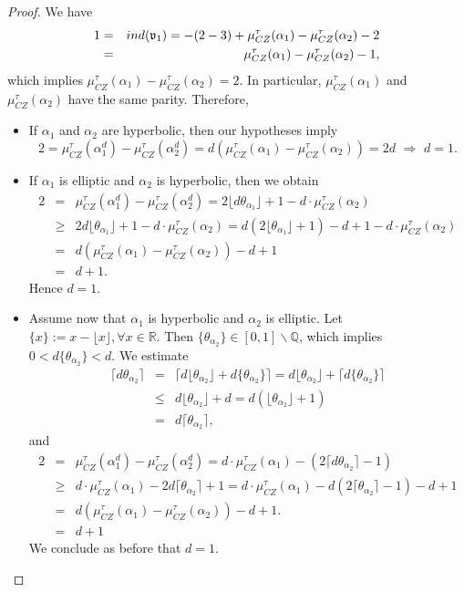 \documentclass[10pt,a4paper]{amsart}
\newcommand{\CZ}{\mu_{CZ}^{\tau}}
\newcommand{\Q}{\mathbb{Q}}
\newcommand{\R}{\mathbb{R}}
\newcommand{\ind}{\textnormal{ind}}
\begin{document}
\begin{proof}
We have
\begin{eqnarray*}
1&=&\ind(\mathfrak{v}_1)=-(2-3)+\CZ(\alpha_1)-\CZ(\alpha_2)-2\\
&=& \CZ(\alpha_1)-\CZ(\alpha_2)-1,
\end{eqnarray*}
which implies
$\CZ(\alpha_1)-\CZ(\alpha_2)=2.$
In particular, $\CZ(\alpha_1)$ and $\CZ(\alpha_2)$ have the same parity. Therefore,
\begin{itemize}
    \item If $\alpha_1$ and $\alpha_2$ are hyperbolic, then our hypotheses imply
     $$2=\CZ(\alpha_1^d)-\CZ(\alpha_2^d)=d(\CZ(\alpha_1)-\CZ(\alpha_2))=2d \,\,\Rightarrow \,\, d =1.$$
     \item If $\alpha_1$ is elliptic and $\alpha_2$ is hyperbolic, then we obtain
     \begin{eqnarray*}
     2&=& \CZ(\alpha_1^d)-\CZ(\alpha_2^d)=2\lfloor d\theta_{\alpha_1}\rfloor+1 -d\cdot\CZ(\alpha_2)\\
     &\geq & 2d\lfloor \theta_{\alpha_1}\rfloor+1 -d \cdot \CZ(\alpha_2)=d(2\lfloor \theta_{\alpha_1}\rfloor+1)-d+1 -d \cdot\CZ(\alpha_2)\\
     &=&d(\CZ(\alpha_1)-\CZ(\alpha_2))-d+1\\
     &=& d+1.
     \end{eqnarray*}
     Hence  $d=1$.
     \item Assume now that $\alpha_1$ is hyperbolic and $\alpha_2$ is elliptic. Let $\{x\}:=x-\lfloor x \rfloor, \forall x\in \R$. Then $\{\theta_{\alpha_2}\} \in [0,1] \backslash \Q$, which implies $0<d\{\theta_{\alpha_2}\}<d$. We estimate
    \begin{eqnarray*}
    \lceil d\theta_{\alpha_2} \rceil &=& \big\lceil d \lfloor \theta_{\alpha_2} \rfloor + d\{\theta_{\alpha_2}\} \big\rceil = d \lfloor \theta_{\alpha_2} \rfloor + \lceil d\{\theta_{\alpha_2}\} \rceil \\
    &\leq & d \lfloor \theta_{\alpha_2} \rfloor +d = d(\lfloor \theta_{\alpha_2} \rfloor + 1) \\
    &=& d\lceil \theta_{\alpha_2}\rceil,
    \end{eqnarray*}
    and
    \begin{eqnarray*}
    2&=& \CZ(\alpha_1^d)-\CZ(\alpha_2^d)= d \cdot \CZ(\alpha_1)-(2\lceil d\theta_{\alpha_2}\rceil-1)\\
    &\geq& d \cdot \CZ(\alpha_1)-2d \lceil \theta_{\alpha_2} \rceil + 1 = d \cdot \CZ(\alpha_1)-d(2 \lceil \theta_{\alpha_2} \rceil -1)-d+1 \\
    &=& d(\CZ(\alpha_1)-\CZ(\alpha_2))-d+1. \\
    &=& d+1
    \end{eqnarray*}
    We conclude as before that $d=1$.
\end{itemize}
\end{proof}
\end{document}
